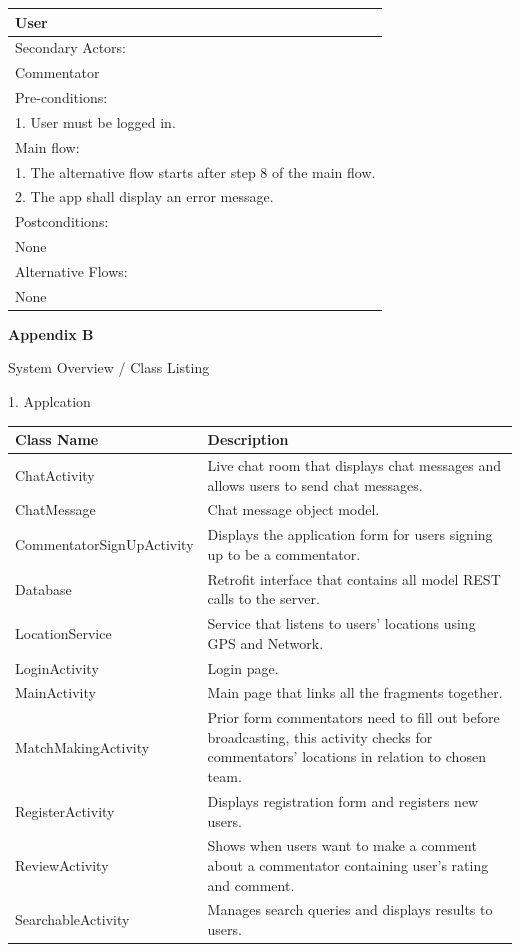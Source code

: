 \documentclass{article}
\begin{document}
\begin{flushleft}
\begin{longtable}[l]{|l|}
User\\
\hline
Secondary Actors:\\
Commentator\\
\hline
Pre-conditions:\\
1. User must be logged in.\\
\hline
Main flow:\\
1. The alternative flow starts after step 8 of the main flow.\\
2. The app shall display an error message.\\
\hline
Postconditions:\\
None\\
\hline
Alternative Flows:\\
None\\
\hline
\end{longtable}
{\Large \textbf{Appendix B}}\par 
{\huge System Overview / Class Listing}\par
{\large 1. Applcation}\par
\begin{longtable}[l]{|l|p{10cm}|}
\hline
\textbf{Class Name} & \textbf{Description}\\
\hline
ChatActivity & Live chat room that displays chat messages and allows users to send chat messages.\\
\hline
ChatMessage & Chat message object model.\\
\hline
CommentatorSignUpActivity & Displays the application form for users signing up to be a commentator.\\
\hline
Database & Retrofit interface that contains all model REST calls to the server.\\
\hline
LocationService & Service that listens to users' locations using GPS and Network.\\
\hline
LoginActivity & Login page.\\
\hline
MainActivity & Main page that links all the fragments together.\\
\hline
MatchMakingActivity & Prior form commentators need to fill out before broadcasting, this activity checks for commentators' locations in relation to chosen team.\\
\hline
RegisterActivity & Displays registration form and registers new users.\\
\hline
ReviewActivity & Shows when users want to make a comment about a commentator containing user's rating and comment.\\
\hline
SearchableActivity & Manages search queries and displays results to users.\\

\end{longtable}
\end{flushleft}
\end{document}
